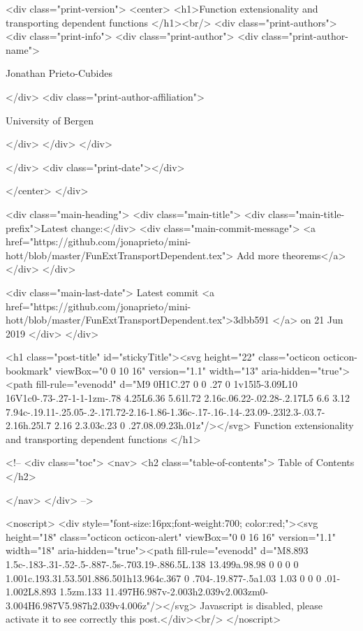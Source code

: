   <div class="print-version">
    <center>
      <h1>Function extensionality and transporting dependent functions </h1><br/>
        <div class="print-authors">
          <div class="print-info">
            <div class="print-author">
              <div class="print-author-name">
                
                  Jonathan Prieto-Cubides
                
              </div>
              <div class="print-author-affiliation">
                
                  University of Bergen
                
                </div>
            </div>
          </div>
          
          
        </div>
        <div class="print-date"></div>
        
        
    </center>
  </div>

  
  <div class="main-heading">
    <div class="main-title">
      <div class="main-title-prefix">Latest change:</div>
      <div class="main-commit-message">
            <a href="https://github.com/jonaprieto/mini-hott/blob/master/FunExtTransportDependent.tex">
              Add more theorems</a>
      </div>
    </div>

    <div class="main-last-date">
      Latest commit <a href="https://github.com/jonaprieto/mini-hott/blob/master/FunExtTransportDependent.tex">3dbb591 </a> on  21 Jun 2019
    </div>
  </div>
  
  <h1 class="post-title" id="stickyTitle"><svg height="22" class="octicon octicon-bookmark" viewBox="0 0 10 16" version="1.1" width="13" aria-hidden="true"><path fill-rule="evenodd" d="M9 0H1C.27 0 0 .27 0 1v15l5-3.09L10 16V1c0-.73-.27-1-1-1zm-.78 4.25L6.36 5.61l.72 2.16c.06.22-.02.28-.2.17L5 6.6 3.12 7.94c-.19.11-.25.05-.2-.17l.72-2.16-1.86-1.36c-.17-.16-.14-.23.09-.23l2.3-.03.7-2.16h.25l.7 2.16 2.3.03c.23 0 .27.08.09.23h.01z"/></svg> Function extensionality and transporting dependent functions 
  </h1>

  <!-- 
  <div class="toc">
    <nav>
    <h2 class="table-of-contents"> Table of Contents </h2>
      

    </nav>
  </div>
   -->

  <noscript>
  <div style="font-size:16px;font-weight:700; color:red;"><svg height="18" class="octicon octicon-alert" viewBox="0 0 16 16" version="1.1" width="18" aria-hidden="true"><path fill-rule="evenodd" d="M8.893 1.5c-.183-.31-.52-.5-.887-.5s-.703.19-.886.5L.138 13.499a.98.98 0 0 0 0 1.001c.193.31.53.501.886.501h13.964c.367 0 .704-.19.877-.5a1.03 1.03 0 0 0 .01-1.002L8.893 1.5zm.133 11.497H6.987v-2.003h2.039v2.003zm0-3.004H6.987V5.987h2.039v4.006z"/></svg> Javascript is disabled, please activate it to see correctly this post.</div><br/>
  </noscript>


